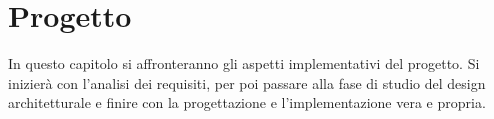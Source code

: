 \chapter{Progetto}\label{chap:Sviluppo}
In questo capitolo si affronteranno gli aspetti implementativi del progetto. Si inizierà con l'analisi dei requisiti, per poi passare alla fase di studio del design architetturale e
finire con la progettazione e l'implementazione vera e propria.






